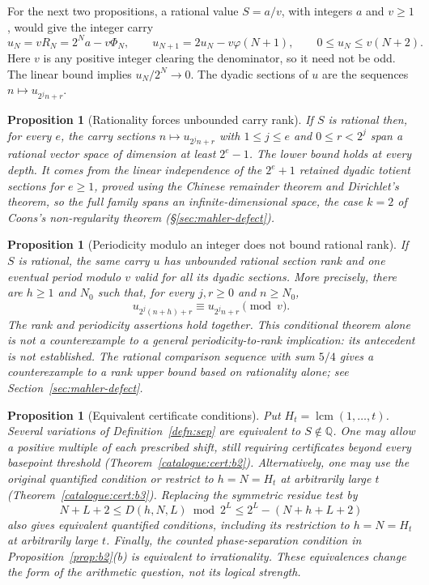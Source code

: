 \documentclass[11pt]{article}
\theoremstyle{plain}
\newtheorem{prop}[thm]{Proposition}
\theoremstyle{definition}
\theoremstyle{remark}
\begin{document}
For the next two propositions, a rational value $S=a/v$, with integers
$a$ and $v\ge1$, would give the integer carry
\[
 u_N=vR_N=2^Na-v\Phi_N,\qquad
 u_{N+1}=2u_N-v\varphi(N+1),\qquad 0\le u_N\le v(N+2).
\]
Here $v$ is any positive integer clearing the denominator, so it
need not be odd. The linear bound implies $u_N/2^N\to0$.
The dyadic sections of $u$ are the sequences $n\mapsto u_{2^jn+r}$.

\begin{prop}[Rationality forces unbounded carry rank]
\label{prop:rank}
If $S$ is rational then, for every $e$, the carry sections
$n\mapsto u_{2^jn+r}$ with $1\le j\le e$ and $0\le r<2^j$ span a rational
vector space of dimension at least $2^{e}-1$.
The lower bound holds at every depth. It comes from the linear independence
of the $2^e+1$ retained dyadic totient sections for $e\ge1$, proved using
the Chinese remainder theorem and Dirichlet's theorem,
so the full family spans an infinite-dimensional space,
the case $k=2$ of Coons's non-regularity theorem (\S\ref{sec:mahler-defect}).
\end{prop}

\begin{prop}[Periodicity modulo an integer does not bound rational rank]
\label{prop:period-not-rank}
If $S$ is rational, the same carry $u$ has unbounded rational section rank
and one eventual period modulo $v$ valid for all its dyadic sections.
More precisely, there are $h\ge1$ and $N_0$ such that, for every $j,r\ge0$
and $n\ge N_0$,
\[
 u_{2^j(n+h)+r}\equiv u_{2^jn+r}\pmod v.
\]
The rank and periodicity assertions hold together.
This conditional theorem alone is not a counterexample to a general
periodicity-to-rank implication: its antecedent is not established.
The rational comparison sequence with sum $5/4$ gives a
counterexample to a rank upper bound based on rationality alone;
see Section~\ref{sec:mahler-defect}.
\end{prop}

\begin{prop}[Equivalent certificate conditions]
\label{prop:iffs}
Put $H_t=\operatorname{lcm}(1,\ldots,t)$. Several variations of
Definition~\ref{defn:sep} are equivalent to $S\notin\mathbb Q$. One may allow a positive multiple of each prescribed
shift, still requiring certificates beyond every basepoint threshold
(Theorem~\ref{catalogue:cert:b2}).
Alternatively, one may use the original quantified condition
or restrict to $h=N=H_t$ at arbitrarily large $t$
(Theorem~\ref{catalogue:cert:b3}).
Replacing the symmetric residue test by
\[
 N+L+2\le D(h,N,L)\bmod2^L\le2^L-(N+h+L+2)
\]
also gives equivalent quantified conditions, including its restriction to
$h=N=H_t$ at arbitrarily large $t$.
Finally, the counted phase-separation condition in
Proposition~\ref{prop:b2}(b) is equivalent to irrationality.
These equivalences change the form of the arithmetic question, not its
logical strength.
\end{prop}
\end{document}
